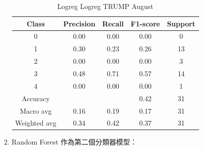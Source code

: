 \begin{enumerate}
\begin{enumerate}
\begin{table}[H]
            \vspace{1em} %
            
            \scriptsize
            \begin{tabular}{c|cccc}
            \hline
            Class & Precision & Recall & F1-score & Support \\
            \hline
            0 & 0.00 & 0.00 & 0.00 & 0 \\
            1 & 0.30 & 0.23 & 0.26 & 13 \\
            2 & 0.00 & 0.00 & 0.00 & 3 \\
            3 & 0.48 & 0.71 & 0.57 & 14 \\
            4 & 0.00 & 0.00 & 0.00 & 1 \\
            \hline
            Accuracy &       &      & 0.42 & 31 \\
            Macro avg & 0.16 & 0.19 & 0.17 & 31 \\
            Weighted avg & 0.34 & 0.42 & 0.37 & 31 \\
            \hline
            \end{tabular}
            \caption{Logreg Logreg TRUMP August}
            \label{tab:classifier_2_report_logreg_logreg_trump_filtered_aug}
            \end{table}

            \pagebreak

            \item Random Forest 作為第二個分類器模型：
            

\end{enumerate}
\end{enumerate}
